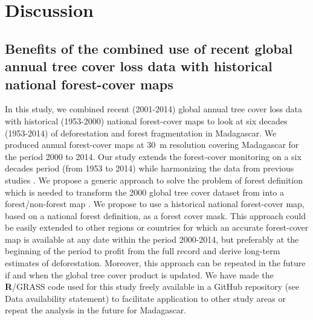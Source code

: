 \documentclass[a4paper, 12pt, leqno]{article} %
\newcommand{\R}{\textnormal{\sffamily\bfseries R}}
\begin{document}
\newpage

\section{Discussion}
\label{discussion}

\subsection{Benefits of the combined use of recent global annual
  tree cover loss data with historical national forest-cover maps}

In this study, we combined recent (2001-2014) global annual tree cover
loss data \citep{Hansen2013} with historical (1953-2000) national
forest-cover maps \citep{Harper2007} to look at six decades
(1953-2014) of deforestation and forest fragmentation in
Madagascar. We produced annual forest-cover maps at 30~m resolution
covering Madagascar for the period 2000 to 2014. Our study extends the
forest-cover monitoring on a six decades period (from 1953 to 2014)
while harmonizing the data from previous studies \citep{Harper2007,
  MEFT2009, ONE2015}. We propose a generic approach to solve the
problem of forest definition which is needed to transform the 2000
global tree cover dataset from \citet{Hansen2013} into a
forest/non-forest map \citep{Tropek2014}. We propose to use a
historical national forest-cover map, based on a national forest
definition, as a forest cover mask. This approach could be easily
extended to other regions or countries for which an accurate
forest-cover map is available at any date within the period 2000-2014,
but preferably at the beginning of the period to profit from the full
record and derive long-term estimates of deforestation. Moreover, this
approach can be repeated in the future if and when the global tree
cover product is updated. We have made the \R{}/GRASS code used for this
study freely available in a GitHub repository (see Data availability
statement) to facilitate application to other study areas or repeat
the analysis in the future for Madagascar.
\end{document}
